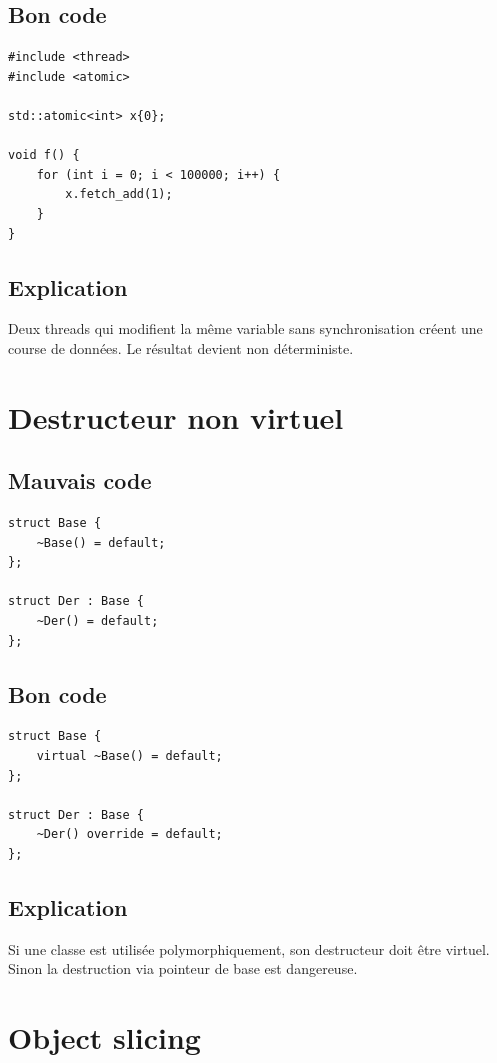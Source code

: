 \documentclass[a4paper,11pt]{report}
\begin{document}
\section{Bon code}
\begin{lstlisting}
#include <thread>
#include <atomic>

std::atomic<int> x{0};

void f() {
    for (int i = 0; i < 100000; i++) {
        x.fetch_add(1);
    }
}
\end{lstlisting}

\section{Explication}
Deux threads qui modifient la même variable sans synchronisation créent une course de données.
Le résultat devient non déterministe.

\chapter{Destructeur non virtuel}

\section{Mauvais code}
\begin{lstlisting}
struct Base {
    ~Base() = default;
};

struct Der : Base {
    ~Der() = default;
};
\end{lstlisting}

\section{Bon code}
\begin{lstlisting}
struct Base {
    virtual ~Base() = default;
};

struct Der : Base {
    ~Der() override = default;
};
\end{lstlisting}

\section{Explication}
Si une classe est utilisée polymorphiquement, son destructeur doit être virtuel.
Sinon la destruction via pointeur de base est dangereuse.

\chapter{Object slicing}
\end{document}
